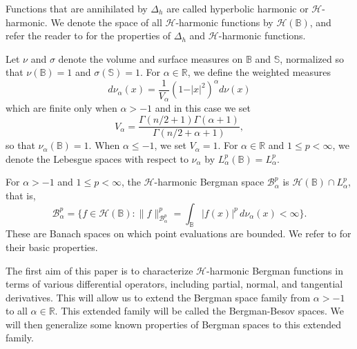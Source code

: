 \documentclass{amsart}
\theoremstyle{definition}
\theoremstyle{remark}
\begin{document}
Functions that are annihilated by $\Delta_h$ are called hyperbolic harmonic or
$\mathcal H$-harmonic.
We denote the space of all $\mathcal H$-harmonic functions by $\mathcal H(\mathbb B)$,
and refer the reader to \cite{St1} for the properties of $\Delta_h$ and
$\mathcal H$-harmonic functions.

Let $\nu$ and $\sigma$ denote the volume and surface measures on $\mathbb B$
and $\mathbb S$, normalized so that $\nu(\mathbb B)=1$ and $\sigma(\mathbb S)=1$.
For $\alpha\in\mathbb R$, we define the weighted measures
\begin{equation*}
  d\nu_\alpha(x)=\frac{1}{V_\alpha}(1-\vert x\vert^2)^\alpha d\nu(x)
\end{equation*}
which are finite only when $\alpha>-1$ and in this case
we set
\begin{equation*}
V_\alpha=\frac{\Gamma(n/2+1)\Gamma(\alpha+1)}{\Gamma(n/2+\alpha+1)},
\end{equation*}
so that $\nu_\alpha(\mathbb B)=1$.
When $\alpha\le -1$, we set $V_\alpha=1$.
For $\alpha\in\mathbb R$ and $1\le p<\infty$, we denote the Lebesgue spaces
with respect to $\nu_\alpha$ by $L^p_\alpha(\mathbb B)=L^p_\alpha$.

For $\alpha>-1$ and $1\le p<\infty$, the $\mathcal H$-harmonic Bergman
space $\mathcal B^p_\alpha$ is $\mathcal H(\mathbb B)\cap L^p_\alpha$,
that is,
\begin{equation*}
\mathcal B^p_\alpha
=\bigl\{f\in\mathcal H(\mathbb B)\colon\|f\|^p_{\mathcal B^p_\alpha}
=\int_{\mathbb B}\vert f(x)\vert^p\,d\nu_\alpha(x)<\infty\bigr\}.
\end{equation*}
These are Banach spaces on which point evaluations are bounded.
We refer to \cite[Chapter 10]{St1} for their basic properties.

The first aim of this paper is to characterize $\mathcal H$-harmonic
Bergman functions in terms of various differential operators, including
partial, normal, and tangential derivatives.
This will allow us to extend the Bergman space family from $\alpha>-1$ to
all $\alpha\in\mathbb R$.
This extended family will be called the Bergman-Besov spaces.
We will then generalize some known properties of Bergman spaces to
this extended family.
\end{document}
